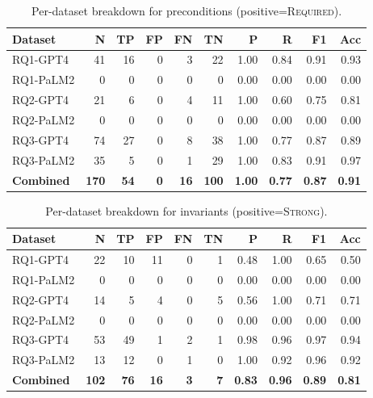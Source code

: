 \begin{table}[h]
  \centering
  \caption{Per-dataset breakdown for preconditions (positive=\textsc{Required}).}
  \label{tab:preconditions}
  \begin{tabular}{lrrrrrrrrr}
    \toprule
    \textbf{Dataset} & \textbf{N} & \textbf{TP} & \textbf{FP} & \textbf{FN} & \textbf{TN} & \textbf{P} & \textbf{R}  & \textbf{F1} & \textbf{Acc} \\
    \midrule
    RQ1-GPT4  & 41  & 16 & 0 & 3 & 22 & 1.00 & 0.84 & 0.91 & 0.93 \\
    RQ1-PaLM2  & 0  & 0 & 0 & 0 & 0 & 0.00 & 0.00 & 0.00 & 0.00 \\
    RQ2-GPT4  & 21  & 6 & 0 & 4 & 11 & 1.00 & 0.60 & 0.75 & 0.81 \\
    RQ2-PaLM2  & 0  & 0 & 0 & 0 & 0 & 0.00 & 0.00 & 0.00 & 0.00 \\
    RQ3-GPT4  & 74  & 27 & 0 & 8 & 38 & 1.00 & 0.77 & 0.87 & 0.89 \\
    RQ3-PaLM2  & 35  & 5 & 0 & 1 & 29 & 1.00 & 0.83 & 0.91 & 0.97 \\
    \midrule
    \textbf{Combined} & \textbf{170} & \textbf{54} & \textbf{0} & \textbf{16} & \textbf{100} & \textbf{1.00} & \textbf{0.77} & \textbf{0.87} & \textbf{0.91} \\
    \bottomrule
  \end{tabular}
\end{table}

\begin{table}[h]
  \centering
  \caption{Per-dataset breakdown for invariants (positive=\textsc{Strong}).}
  \label{tab:invariants}
  \begin{tabular}{lrrrrrrrrr}
    \toprule
    \textbf{Dataset} & \textbf{N} & \textbf{TP} & \textbf{FP} & \textbf{FN} & \textbf{TN} & \textbf{P} & \textbf{R}  & \textbf{F1} & \textbf{Acc} \\
    \midrule
    RQ1-GPT4  & 22  & 10 & 11 & 0 & 1 & 0.48 & 1.00 & 0.65 & 0.50 \\
    RQ1-PaLM2  & 0  & 0 & 0 & 0 & 0 & 0.00 & 0.00 & 0.00 & 0.00 \\
    RQ2-GPT4  & 14  & 5 & 4 & 0 & 5 & 0.56 & 1.00 & 0.71 & 0.71 \\
    RQ2-PaLM2  & 0  & 0 & 0 & 0 & 0 & 0.00 & 0.00 & 0.00 & 0.00 \\
    RQ3-GPT4  & 53  & 49 & 1 & 2 & 1 & 0.98 & 0.96 & 0.97 & 0.94 \\
    RQ3-PaLM2  & 13  & 12 & 0 & 1 & 0 & 1.00 & 0.92 & 0.96 & 0.92 \\
    \midrule
    \textbf{Combined} & \textbf{102} & \textbf{76} & \textbf{16} & \textbf{3} & \textbf{7} & \textbf{0.83} & \textbf{0.96} & \textbf{0.89} & \textbf{0.81} \\
    \bottomrule
  \end{tabular}
\end{table}